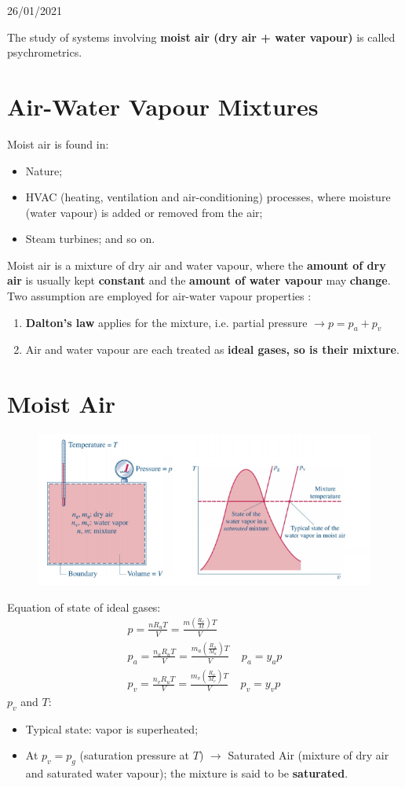 \documentclass[class=report, crop=false, 12pt,a4paper]{standalone}
\numberwithin{equation}{section}
\begin{document}
\begin{center}
  26/01/2021
\end{center}
The study of systems involving \textbf{moist air (dry air + water vapour)} is called psychrometrics.
\section{Air-Water Vapour Mixtures}
Moist air is found in:
\begin{itemize}[noitemsep]
  \item Nature;
  \item HVAC (heating, ventilation and air-conditioning) processes, where moisture (water vapour) is added or removed from the air;
  \item Steam turbines; and so on.
\end{itemize}
Moist air is a mixture of dry air and water vapour, where the \textbf{amount of dry air} is usually kept \textbf{constant} and the \textbf{amount of water vapour} may \textbf{change}. Two assumption are employed for air-water vapour properties :
\begin{enumerate}[noitemsep]
  \item \textbf{Dalton’s law} applies for the mixture, i.e. partial pressure $\longrightarrow p = p_a + p_v$
  \item Air and water vapour are each treated as \textbf{ideal gases, so is their mixture}.
\end{enumerate}
\section{Moist Air}
\begin{figure}[H]
  \centering
  \includegraphics[width = 0.9 \textwidth]{../img/diagram98.png}
  \caption{}
\end{figure}
Equation of state of ideal gases:
\begin{gather}
  p = \frac{n R_u T}{V} = \frac{m(\frac{R_u}{M})T}{V} \\[5pt]
  p_a = \frac{n_a R_u T}{V} = \frac{m_a(\frac{R_u}{M_a})T}{V} \ \ \ \ \ p_a = y_ap\\[5pt]
  p_v = \frac{n_v R_u T}{V} = \frac{m_v(\frac{R_u}{M_v})T}{V} \ \ \ \ \ p_v = y_vp
\end{gather}
$p_v$ and $T$:
\begin{itemize}[noitemsep]
  \item Typical state: vapor is superheated;
  \item At $p_v = p_g$ (saturation pressure at $T$) $\longrightarrow$ Saturated Air (mixture of dry air and saturated water vapour); the mixture is said to be \textbf{saturated}.
\end{itemize}
\end{document}
